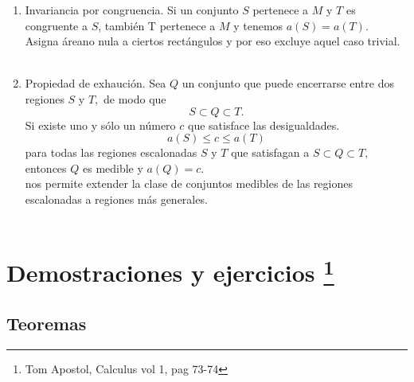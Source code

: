 \begin{tcolorbox}
\begin{enumerate}[\bfseries 5.]
\item Invariancia por congruencia. Si un conjunto $S$ pertenece a $M$ y $T$ es congruente a $S$, también T pertenece a $M$ y tenemos $a(S) = a(T).$\\
Asigna áreano nula a ciertos rectángulos y por eso excluye aquel caso trivial. \\\\

\item Propiedad de exhaución. Sea $Q$ un conjunto que puede encerrarse entre dos regiones $S$ y $T,$ de modo que $$ S \subset Q \subset T.$$  
Si existe uno y sólo un número $c$ que satisface las desigualdades. $$a(S) \leq c \leq a(T)$$
para todas las regiones escalonadas $S$ y $T$ que satisfagan a $S \subset Q \subset T,$ entonces $Q$ es medible y $a(Q)=c.$\\
nos permite extender la clase de conjuntos medibles de las regiones escalonadas a regiones más generales.\\\\
\end{enumerate}
\end{tcolorbox}

\section[Ejercicios y demostraciones]{Demostraciones y ejercicios \footnote{Tom Apostol, Calculus vol 1, pag 73-74}}
\subsection{Teoremas}

